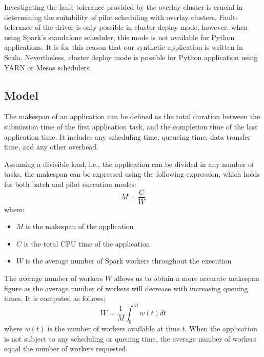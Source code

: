 \documentclass{IEEEtran}
\newcommand{\todo}[1]{\marginpar{\parbox{18mm}{\flushleft\tiny\color{red}\textbf{TODO}:
      #1}}}
\begin{document}
    Investigating the fault-tolerance provided by the overlay cluster is
    crucial in determining the suitability of pilot scheduling with overlay clusters.
    Fault-tolerance of the driver is only possible in cluster deploy mode, however,
    when using Spark's standalone scheduler, this mode is not available for Python 
    applications. It is for this reason that our synthetic application is written
    in Scala. Nevertheless, cluster deploy mode is possible for Python application
    using YARN or Mesos schedulers.

    
   
    \todo{walltime parameter of workflow}
    \subsection{Model}

    The makespan of an application can be defined as the total duration
    between the submission time of the first application task, and the
    completion time of the last application time. It includes any
    scheduling time, queueing time, data transfer time, and any other
    overhead.
    
    Assuming a divisible load, i.e., the application can be divided in any
    number of tasks, the makespan can be expressed using the following
    expression, which holds for both batch and pilot execution modes:
    \begin{equation}
        M = \frac{C}{W} \label{eq:mcw}
    \end{equation}
    where:
    \begin{itemize}
        \item $M$ is the makespan of the application
        \item $C$ is the total CPU time of the application
        \item $W$ is the average number of Spark workers throughout the execution
    \end{itemize}
    The average number of workers $W$ allows us to obtain a more accurate makespan
    figure as the average number of workers will decrease with increasing 
    queuing times. It is computed as follows:
    \begin{equation}
        W = \frac{1}{M}\int_0^M{w(t)dt}\label{eq:avgw}
    \end{equation}
    where $w(t)$ is the number of workers available at time $t$. When the
    application is not subject to any scheduling or queuing time, the
    average number of workers equal the number of workers requested. 
\end{document}

